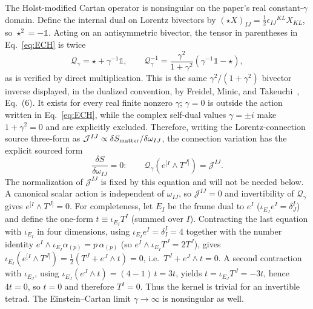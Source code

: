 \documentclass[aps,prd,twocolumn,superscriptaddress,preprintnumbers,nofootinbib,longbibliography,floatfix]{revtex4-2}
\begin{document}
The Holst-modified Cartan operator is nonsingular on the paper's real
constant-$\gamma$ domain.  Define the internal dual on Lorentz bivectors by
$(\star X)_{IJ}=\tfrac12\epsilon_{IJ}{}^{KL}X_{KL}$, so
$\star^2=-\mathbb 1$.  Acting on an antisymmetric bivector, the tensor in
parentheses in Eq.~\eqref{eq:ECH} is twice
\begin{equation}\label{eq:holst_cartan_inverse}
\mathcal Q_\gamma=\star+\gamma^{-1}\mathbb 1,\qquad
\mathcal Q_\gamma^{-1}
=\frac{\gamma^2}{1+\gamma^2}
\left(\gamma^{-1}\mathbb 1-\star\right),
\end{equation}
as is verified by direct multiplication.  This is the same
$\gamma^2/(1+\gamma^2)$ bivector inverse displayed, in the dualized
convention, by Freidel, Minic, and Takeuchi~\cite{Freidel2005}, Eq.~(6).
It exists for every real finite nonzero $\gamma$; $\gamma=0$ is outside the
action written in Eq.~\eqref{eq:ECH}, while the complex self-dual values
$\gamma=\pm i$ make $1+\gamma^2=0$ and are explicitly excluded.  Therefore,
writing the Lorentz-connection source three-form as
$\mathcal J^{IJ}\propto\delta S_{\rm matter}/\delta\omega_{IJ}$, the
connection variation has the explicit sourced form
\begin{equation}\label{eq:cartan_source}
\frac{\delta S}{\delta\omega_{IJ}}=0:\qquad
\mathcal Q_\gamma\!\left(e^{[I}\wedge T^{J]}\right)=\mathcal J^{IJ}.
\end{equation}
The normalization of $\mathcal J^{IJ}$ is fixed by this equation and will not
be needed below.  A canonical scalar action is independent of
$\omega_{IJ}$, so $\mathcal J^{IJ}=0$ and invertibility of
$\mathcal Q_\gamma$ gives $e^{[I}\wedge T^{J]}=0$.
For completeness, let $E_I$ be the frame dual to $e^I$
($\iota_{E_J}e^I=\delta^I_J$) and define the one-form
$t\equiv\iota_{E_I}T^I$ (summed over $I$).  Contracting the last equation with
$\iota_{E_I}$ in four dimensions, using $\iota_{E_I}e^I=\delta^I_I=4$ together
with the number identity $e^I\wedge\iota_{E_I}\alpha_{(p)}=p\,\alpha_{(p)}$
(so $e^I\wedge\iota_{E_I}T^J=2T^J$), gives
$\iota_{E_I}(e^{[I}\wedge T^{J]})=\tfrac12(T^J+e^J\wedge t)=0$, i.e.\
$T^J+e^J\wedge t=0$.  A second contraction with $\iota_{E_J}$, using
$\iota_{E_J}(e^J\wedge t)=(4-1)\,t=3t$, yields
$t=\iota_{E_J}T^J=-3t$, hence $4t=0$, so $t=0$ and therefore $T^I=0$.  Thus the
kernel is trivial for an invertible tetrad.  The Einstein--Cartan limit
$\gamma\to\infty$ is nonsingular as well.
\end{document}
